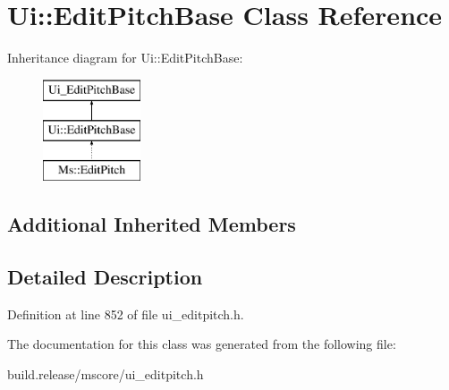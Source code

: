 \hypertarget{class_ui_1_1_edit_pitch_base}{}\section{Ui\+:\+:Edit\+Pitch\+Base Class Reference}
\label{class_ui_1_1_edit_pitch_base}
Inheritance diagram for Ui\+:\+:Edit\+Pitch\+Base\+:\begin{figure}[H]
\begin{center}
\leavevmode
\includegraphics[height=3.000000cm]{class_ui_1_1_edit_pitch_base}
\end{center}
\end{figure}
\subsection*{Additional Inherited Members}


\subsection{Detailed Description}


Definition at line 852 of file ui\+\_\+editpitch.\+h.



The documentation for this class was generated from the following file\+:\begin{DoxyCompactItemize}
\item 
build.\+release/mscore/ui\+\_\+editpitch.\+h\end{DoxyCompactItemize}
